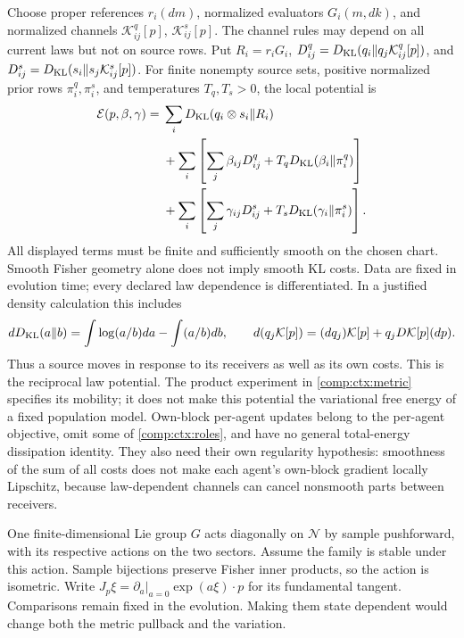 Choose proper references $r_i(dm)$, normalized evaluators $G_i(m,dk)$, and normalized channels $\mathcal K^q_{ij}[p]$, $\mathcal K^s_{ij}[p]$. The channel rules may depend on all current laws but not on source rows. Put $R_i=r_iG_i$, $D^q_{ij}=D_{\mathrm{KL}}(q_i\Vert q_j\mathcal K^q_{ij}[p])$, and $D^s_{ij}=D_{\mathrm{KL}}(s_i\Vert s_j\mathcal K^s_{ij}[p])$. For finite nonempty source sets, positive normalized prior rows $\pi_i^q,\pi_i^s$, and temperatures $T_q,T_s>0$, the local potential is
\begin{equation}
 \begin{aligned}
 \mathcal E(p,\beta,\gamma)={}&\sum_iD_{\mathrm{KL}}(q_i\otimes s_i\Vert R_i)\\
 &+\sum_i\left[\sum_j\beta_{ij}D^q_{ij}
                         +T_qD_{\mathrm{KL}}(\beta_i\Vert\pi_i^q)\right]\\
 &+\sum_i\left[\sum_j\gamma_{ij}D^s_{ij}
                         +T_sD_{\mathrm{KL}}(\gamma_i\Vert\pi_i^s)\right].
 \end{aligned}
 \label{comp:ctx:potential}
\end{equation}
All displayed terms must be finite and sufficiently smooth on the chosen chart. Smooth Fisher geometry alone does not imply smooth KL costs. Data are fixed in evolution time; every declared law dependence is differentiated. In a justified density calculation this includes
\begin{equation}
 dD_{\mathrm{KL}}(a\Vert b)=\int\log(a/b)da-\int(a/b)db,\qquad
 d(q_j\mathcal K[p])=(dq_j)\mathcal K[p]+q_jD\mathcal K[p](dp).
 \label{comp:ctx:roles}
\end{equation}
Thus a source moves in response to its receivers as well as its own costs. This is the reciprocal law potential. The product experiment in \cref{comp:ctx:metric} specifies its mobility; it does not make this potential the variational free energy of a fixed population model. Own-block per-agent updates belong to the per-agent objective, omit some of \cref{comp:ctx:roles}, and have no general total-energy dissipation identity. They also need their own regularity hypothesis: smoothness of the sum of all costs does not make each agent's own-block gradient locally Lipschitz, because law-dependent channels can cancel nonsmooth parts between receivers.

One finite-dimensional Lie group $G$ acts diagonally on $\mathcal N$ by sample pushforward, with its respective actions on the two sectors. Assume the family is stable under this action. Sample bijections preserve Fisher inner products, so the action is isometric. Write $J_p\xi=\left.\partial_a\right|_{a=0}\exp(a\xi)\cdot p$ for its fundamental tangent. Comparisons remain fixed in the evolution. Making them state dependent would change both the metric pullback and the variation.

